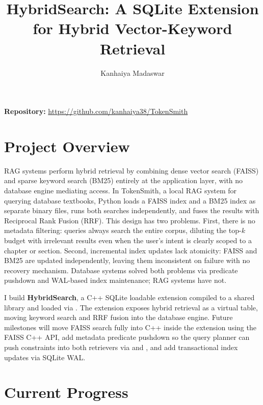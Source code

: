 \documentclass[sigconf,11pt]{acmart}
\begin{document}
\title{HybridSearch: A SQLite Extension for Hybrid Vector-Keyword Retrieval}

\author{Kanhaiya Madaswar}
\email{}

\maketitle

\noindent\textbf{Repository:} \url{https://github.com/kanhaiya38/TokenSmith}

\vspace{-1em}
\section{Project Overview}

RAG systems perform hybrid retrieval by combining dense vector search (FAISS)
and sparse keyword search (BM25) entirely at the application layer, with no
database engine mediating access. In TokenSmith, a local RAG system for
querying database textbooks, Python loads a FAISS index and a BM25 index as
separate binary files, runs both searches independently, and fuses the results
with Reciprocal Rank Fusion (RRF). This design has two problems. First, there
is no metadata filtering: queries always search the entire corpus, diluting the
top-$k$ budget with irrelevant results even when the user's intent is clearly
scoped to a chapter or section. Second, incremental index updates lack
atomicity: FAISS and BM25 are updated independently, leaving them inconsistent
on failure with no recovery mechanism. Database systems solved both problems via
predicate pushdown and WAL-based index maintenance; RAG systems have not.

I build \textbf{HybridSearch}, a C++ SQLite loadable extension compiled to a
shared library and loaded via . The extension
exposes hybrid retrieval as a virtual table, moving keyword search and RRF
fusion into the database engine. Future milestones will move FAISS search fully
into C++ inside the extension using the FAISS C++ API, add metadata predicate
pushdown so the query planner can push  constraints into both
retrievers via  and , and add transactional
index updates via SQLite WAL.

\section{Current Progress}
\end{document}
